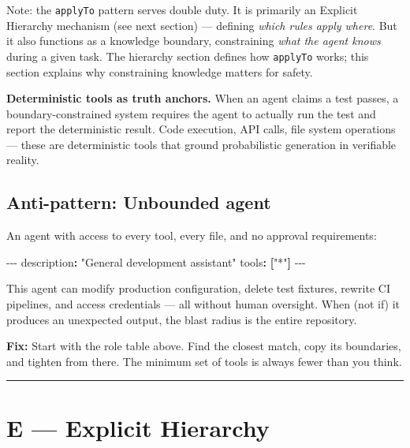 \documentclass[
  a4paper,
  DIV=11,
  numbers=noendperiod]{scrreprt}
\newenvironment{Shaded}{\begin{snugshade}}{\end{snugshade}}
\newcommand{\AttributeTok}[1]{\textcolor[rgb]{0.40,0.45,0.13}{#1}}
\newcommand{\FunctionTok}[1]{\textcolor[rgb]{0.28,0.35,0.67}{#1}}
\newcommand{\KeywordTok}[1]{\textcolor[rgb]{0.00,0.23,0.31}{\textbf{#1}}}
\newcommand{\PreprocessorTok}[1]{\textcolor[rgb]{0.68,0.00,0.00}{#1}}
\newcommand{\StringTok}[1]{\textcolor[rgb]{0.13,0.47,0.30}{#1}}
\begin{document}
Note: the \texttt{applyTo} pattern serves double duty. It is primarily
an Explicit Hierarchy mechanism (see next section) --- defining
\emph{which rules apply where}. But it also functions as a knowledge
boundary, constraining \emph{what the agent knows} during a given task.
The hierarchy section defines how \texttt{applyTo} works; this section
explains why constraining knowledge matters for safety.

\textbf{Deterministic tools as truth anchors.} When an agent claims a
test passes, a boundary-constrained system requires the agent to
actually run the test and report the deterministic result. Code
execution, API calls, file system operations --- these are deterministic
tools that ground probabilistic generation in verifiable reality.

\subsection{Anti-pattern: Unbounded
agent}\label{anti-pattern-unbounded-agent}

An agent with access to every tool, every file, and no approval
requirements:

\begin{Shaded}
\begin{Highlighting}[]
\PreprocessorTok{{-}{-}{-}}
\FunctionTok{description}\KeywordTok{:}\AttributeTok{ }\StringTok{"General development assistant"}
\FunctionTok{tools}\KeywordTok{:}\AttributeTok{ }\KeywordTok{[}\StringTok{"*"}\KeywordTok{]}
\PreprocessorTok{{-}{-}{-}}
\end{Highlighting}
\end{Shaded}

This agent can modify production configuration, delete test fixtures,
rewrite CI pipelines, and access credentials --- all without human
oversight. When (not if) it produces an unexpected output, the blast
radius is the entire repository.

\textbf{Fix:} Start with the role table above. Find the closest match,
copy its boundaries, and tighten from there. The minimum set of tools is
always fewer than you think.

\begin{center}\rule{0.5\linewidth}{0.5pt}\end{center}

\section{E --- Explicit Hierarchy}\label{e-explicit-hierarchy}
\end{document}
